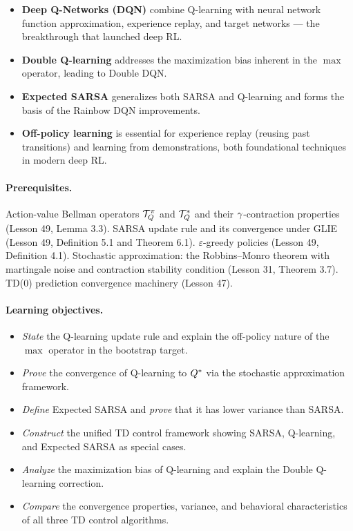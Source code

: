 \documentclass[11pt,a4paper]{article}
\begin{document}
\begin{rlconnection}[title={Where Q-Learning and Its Variants Appear}]
\begin{itemize}[nosep]
  \item \textbf{Deep Q-Networks (DQN)} combine Q-learning with
    neural network function approximation, experience replay, and
    target networks --- the breakthrough that launched deep RL.
  \item \textbf{Double Q-learning} addresses the maximization bias
    inherent in the $\max$ operator, leading to Double DQN.
  \item \textbf{Expected SARSA} generalizes both SARSA and
    Q-learning and forms the basis of the Rainbow DQN improvements.
  \item \textbf{Off-policy learning} is essential for experience
    replay (reusing past transitions) and learning from
    demonstrations, both foundational techniques in modern deep RL.
\end{itemize}
\end{rlconnection}

\paragraph{Prerequisites.}
Action-value Bellman operators $\mathcal{T}^\pi_Q$ and
$\mathcal{T}^*_Q$ and their $\gamma$-contraction properties
(Lesson 49, Lemma 3.3). SARSA update rule and its convergence under
GLIE (Lesson 49, Definition 5.1 and Theorem 6.1).
$\varepsilon$-greedy policies (Lesson 49, Definition 4.1).
Stochastic approximation: the Robbins--Monro theorem with martingale
noise and contraction stability condition (Lesson 31, Theorem 3.7).
TD(0) prediction convergence machinery (Lesson 47).

\paragraph{Learning objectives.}
\begin{itemize}
  \item \emph{State} the Q-learning update rule and explain the
    off-policy nature of the $\max$ operator in the bootstrap target.
  \item \emph{Prove} the convergence of Q-learning to $Q^*$
    via the stochastic approximation framework.
  \item \emph{Define} Expected SARSA and \emph{prove} that it has
    lower variance than SARSA.
  \item \emph{Construct} the unified TD control framework showing
    SARSA, Q-learning, and Expected SARSA as special cases.
  \item \emph{Analyze} the maximization bias of Q-learning and
    explain the Double Q-learning correction.
  \item \emph{Compare} the convergence properties, variance, and
    behavioral characteristics of all three TD control algorithms.
\end{itemize}
\end{document}
